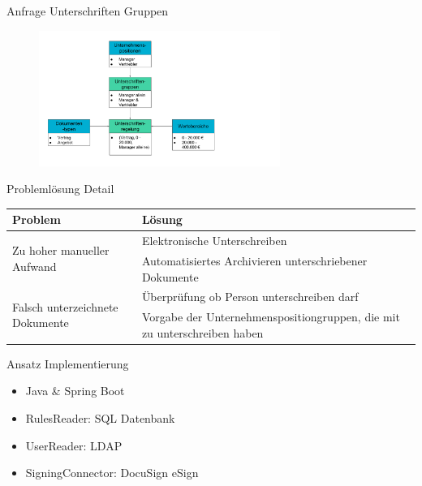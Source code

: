 \documentclass[utf8, xcolor, usenames,dvipsnames, aspectratio=169, notes, ]{beamer}
\begin{document}
\begin{frame}{Anfrage Unterschriften Gruppen}
	\begin{figure}[t]
		\centering
		\includegraphics[width=0.7\textwidth, height=0.7\textheight]{./images/ruleSet}
	\end{figure}
\end{frame}

\begin{frame}{Problemlösung Detail}
	\begin{table}
		\begin{tabular}{|p{6cm}|p{6cm}|}\hline
			\textbf{Problem} & \textbf{Lösung} \\ \hline
			\multirow{2}{*}{Zu hoher manueller Aufwand} & Elektronische Unterschreiben \\ \cline{2-2}
								& Automatisiertes Archivieren unterschriebener Dokumente \\ \hline
			\multirow{2}{*}{Falsch unterzeichnete Dokumente}  & Überprüfung ob Person unterschreiben darf \\ \cline{2-2}
								& Vorgabe der Unternehmenspositiongruppen, die mit zu unterschreiben haben \\ \hline
		\end{tabular}
	\end{table}
\end{frame}

\begin{frame}{Ansatz Implementierung}
	\begin{itemize}
		\item Java \& Spring Boot
		\item RulesReader: SQL Datenbank
		\item UserReader: LDAP
		\item SigningConnector: DocuSign eSign
	\end{itemize}
	
\end{frame}
\end{document}
